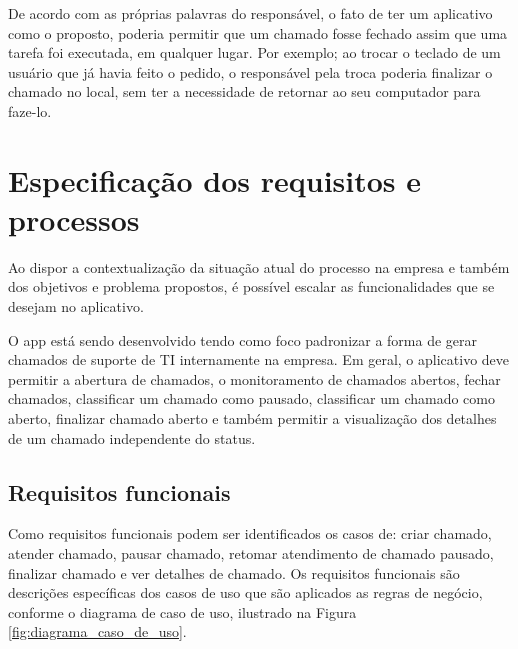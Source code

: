 De acordo com as próprias palavras do responsável, o fato de ter um aplicativo como o proposto, poderia permitir que um chamado fosse fechado assim que uma tarefa foi executada, em qualquer lugar. Por exemplo; ao trocar o teclado de um usuário que já havia feito o pedido, o responsável pela troca poderia finalizar o chamado no local, sem ter a necessidade de retornar ao seu computador para faze-lo.

\section{Especificação dos requisitos e processos}
Ao dispor a contextualização da situação atual do processo na empresa e também dos objetivos e problema propostos, é possível escalar as funcionalidades que se desejam no aplicativo. 

O app está sendo desenvolvido tendo como foco padronizar a forma de gerar chamados de suporte de TI internamente na empresa. Em geral, o aplicativo deve permitir a abertura de chamados, o monitoramento de chamados abertos, fechar chamados, classificar um chamado como pausado, classificar um chamado como aberto, finalizar chamado aberto e também permitir a visualização dos detalhes de um chamado independente do status.


\subsection{Requisitos funcionais} %
Como requisitos funcionais podem ser identificados os casos de: criar chamado, atender chamado, pausar chamado,  retomar atendimento de chamado pausado, finalizar chamado e ver detalhes de chamado. Os requisitos funcionais são descrições específicas dos casos de uso que são aplicados as regras de negócio, conforme o diagrama de caso de uso, ilustrado na Figura \ref{fig:diagrama_caso_de_uso}.

